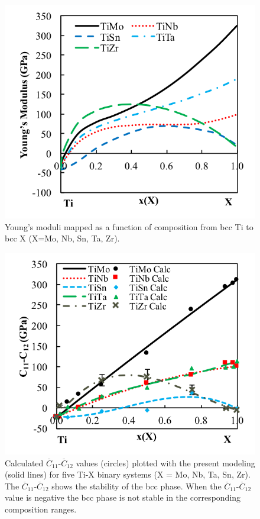 \pagebreak
\begin{figure}[H]
	\centering
	\includegraphics{Chapter-5/Figures/emap.png}
	\caption{Young's moduli mapped as a function of composition from bcc Ti to bcc X (X=Mo, Nb, Sn, Ta, Zr).}
	\label{Ch5-figure:tixmap}
\end{figure}

\pagebreak
\begin{figure}[H]
	\centering
	\includegraphics{Chapter-5/Figures/tixc11-c12.png}
	\caption{Calculated $\overline{C}_{11}$-$\overline{C}_{12}$ values (circles) plotted with the present modeling (solid lines) for five Ti-X binary systems (X = Mo, Nb, Ta, Sn, Zr). The $\overline{C}_{11}$-$\overline{C}_{12}$ shows the stability of the bcc phase. When the $\overline{C}_{11}$-$\overline{C}_{12}$ value is negative the bcc phase is not stable in the corresponding composition ranges.}
	\label{Ch5-figure:tixc11-c12}
\end{figure}

